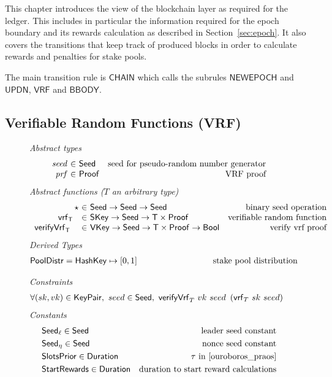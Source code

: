 This chapter introduces the view of the blockchain layer as required for the
ledger. This includes in particular the information required for the epoch
boundary and its rewards calculation as described in Section~\ref{sec:epoch}. It
also covers the transitions that keep track of produced blocks in order to
calculate rewards and penalties for stake pools.

The main transition rule is $\mathsf{CHAIN}$ which calls the subrules
$\mathsf{NEWEPOCH}$ and $\mathsf{UPDN}$, $\mathsf{VRF}$ and $\mathsf{BBODY}$.

\subsection{Verifiable Random Functions (VRF)}
\label{sec:defs-vrf}

\begin{figure}[htb]
  \emph{Abstract types}
  \begin{equation*}
    \begin{array}{r@{~\in~}lr}
      \var{seed} & \Seed  & \text{seed for pseudo-random number generator}\\
      \var{prf} & \Proof  & \text{VRF proof}\\
    \end{array}
  \end{equation*}
  \emph{Abstract functions ($T$ an arbitrary type)}
  \begin{equation*}
    \begin{array}{r@{~\in~}lr}
      \seedOp & \Seed \to \Seed \to \Seed & \text{binary seed operation} \\
      \vrf{\T}{}{} & \SKey \to \Seed \to \T\times\Proof
                   & \text{verifiable random function} \\
      \verifyVrf{\T}{}{}{} & \VKey \to \Seed \to \T\times\Proof \to \Bool
                           & \text{verify vrf proof} \\
    \end{array}
  \end{equation*}
  \emph{Derived Types}
  \begin{align*}
    \PoolDistr = \HashKey \mapsto [0, 1] \text{ \hspace{3cm}stake pool distribution}
  \end{align*}

  \emph{Constraints}
  \begin{align*}
    & \forall (sk, vk) \in \mathsf{KeyPair},~ seed \in \mathsf{Seed},~
    \mathsf{verifyVrf}_{T} ~ vk ~ seed ~\left(\mathsf{vrf}_{T} ~ sk ~ seed\right)
  \end{align*}
  \emph{Constants}
  \begin{align*}
    & \mathsf{Seed}_\ell \in \mathsf{Seed} & \text{leader seed constant} \\
    & \mathsf{Seed}_\eta \in \mathsf{Seed} & \text{nonce seed constant}\\
    & \mathsf{SlotsPrior} \in \mathsf{Duration} & \tau\text{ in \cite{ouroboros_praos}}\\
    & \mathsf{StartRewards} \in \mathsf{Duration} & \text{duration to start reward calculations}\\
  \end{align*}


\end{figure}
